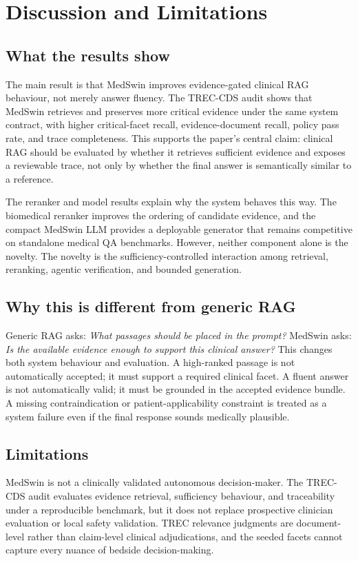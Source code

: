 \documentclass[conference]{IEEEtran}
\begin{document}
\section{Discussion and Limitations}
\label{sec:discussion-limitations}

\subsection{What the results show}
The main result is that MedSwin improves evidence-gated clinical RAG behaviour, not merely answer fluency. The TREC-CDS audit shows that MedSwin retrieves and preserves more critical evidence under the same system contract, with higher critical-facet recall, evidence-document recall, policy pass rate, and trace completeness. This supports the paper's central claim: clinical RAG should be evaluated by whether it retrieves sufficient evidence and exposes a reviewable trace, not only by whether the final answer is semantically similar to a reference.

The reranker and model results explain why the system behaves this way. The biomedical reranker improves the ordering of candidate evidence, and the compact MedSwin LLM provides a deployable generator that remains competitive on standalone medical QA benchmarks. However, neither component alone is the novelty. The novelty is the sufficiency-controlled interaction among retrieval, reranking, agentic verification, and bounded generation.

\subsection{Why this is different from generic RAG}
Generic RAG asks: \emph{What passages should be placed in the prompt?} MedSwin asks: \emph{Is the available evidence enough to support this clinical answer?} This changes both system behaviour and evaluation. A high-ranked passage is not automatically accepted; it must support a required clinical facet. A fluent answer is not automatically valid; it must be grounded in the accepted evidence bundle. A missing contraindication or patient-applicability constraint is treated as a system failure even if the final response sounds medically plausible.

\subsection{Limitations}
MedSwin is not a clinically validated autonomous decision-maker. The TREC-CDS audit evaluates evidence retrieval, sufficiency behaviour, and traceability under a reproducible benchmark, but it does not replace prospective clinician evaluation or local safety validation. TREC relevance judgments are document-level rather than claim-level clinical adjudications, and the seeded facets cannot capture every nuance of bedside decision-making.
\end{document}
